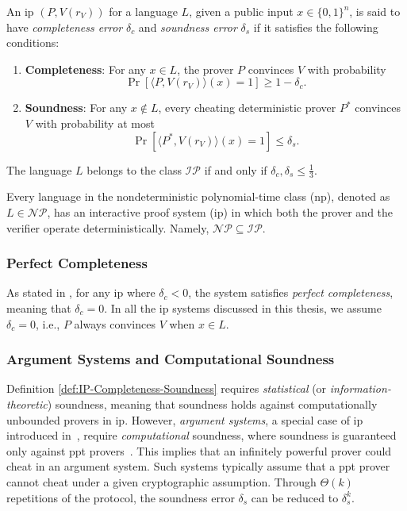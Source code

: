 \begin{definition}\label{def:IP-Completeness-Soundness}
	An \gls{ip} \( (P, V(r_V)) \) for a language \( L \), given a public input \( x \in \{0,1\}^n \), is said to have \textit{completeness error} \( \delta_c \) and \textit{soundness error} \( \delta_s \) if it satisfies the following conditions:
	\begin{enumerate}[leftmargin=2em]
		\item \textbf{Completeness}: For any \( x \in L \), the prover \( P \) convinces \( V \) with probability
		\[
		\Pr [\langle P, V(r_V) \rangle (x) = 1] \geq 1 - \delta_c.
		\]
		\item \textbf{Soundness}: For any \( x \notin L \), every cheating deterministic prover \( P^* \) convinces \( V \) with probability at most
		\[
		\Pr [\langle P^*, V(r_V) \rangle (x) = 1] \leq \delta_s.
		\]
	\end{enumerate}
The language \( L \) belongs to the class \( \mathcal{IP} \) if and only if \( \delta_c, \delta_s \leq \frac{1}{3} \).

\end{definition}

\begin{remark}\label{remark:np_in_ip}
Every language in the nondeterministic polynomial-time class (\gls{np}), denoted as \( L \in \mathcal{NP} \), has an interactive proof system (\gls{ip}) in which both the prover and the verifier operate deterministically. Namely, $\mathcal{NP} \subseteq \mathcal{IP}$.
\end{remark}

\subsubsection{Perfect Completeness}
As stated in \cite{Thaler2022Proofs}, for any \gls{ip} where \( \delta_c < 0 \), the system satisfies \textit{perfect completeness}, meaning that \( \delta_c = 0 \). In all the \gls{ip} systems discussed in this thesis, we assume \(\delta_c = 0\), i.e.,  \( P \) always convinces \( V \) when \( x \in L \). 

\subsubsection{Argument Systems and Computational Soundness}
Definition \ref{def:IP-Completeness-Soundness} requires \textit{statistical} (or \textit{information-theoretic}) soundness, meaning that soundness holds against computationally unbounded provers in \gls{ip}. However, \textit{argument systems}, a special case of \gls{ip} introduced in~\cite{BRASSARD1988Minimum}, require \textit{computational} soundness, where soundness is guaranteed only against \gls{ppt} provers~\cite{Ben-Sasson2016IOP}. This implies that an infinitely powerful prover could cheat in an argument system. Such systems typically assume that a \gls{ppt} prover cannot cheat under a given cryptographic assumption. Through $\Theta(k)$ repetitions of the protocol, the soundness error $\delta_s$ can be reduced to $\delta_s^k$.

